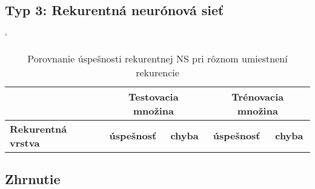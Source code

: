 \subsection{Typ 3: Rekurentná neurónová sieť}
\todo

\begin{table}[h]
\catcode` %
\centering
\begin{tabular}{|l|c|c|c|c|}
\cline{2-5}
\multicolumn{1}{l}{} & \multicolumn{2}{|c|}{\textbf{Testovacia množina}} & \multicolumn{2}{c|}{\textbf{Trénovacia množina}} \\ 
\hline
\textbf{Rekurentná vrstva} & \textbf{úspešnosť} & \textbf{chyba} & \textbf{úspešnosť} & \textbf{chyba}  \\ \hline
\end{tabular}
\caption{Porovnanie úspešnosti rekurentnej NS pri rôznom umiestnení rekurencie}
\label{tab:neuroncountcmp3}
\end{table}

\subsection{Zhrnutie}


\todo






